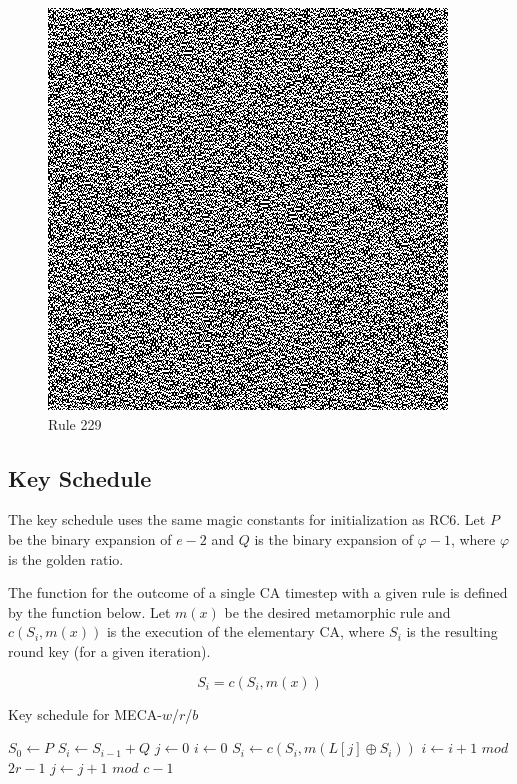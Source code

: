 \documentclass{article}
\begin{document}
\begin{figure}[H]
\begin{center}
\begin{minipage}{0.48\textwidth}
      \caption{Rule 229}
      \label{fig:figure10}
      \centering
      \includegraphics[scale=.5]{229.png}
    \end{minipage}
  \end{center}
\end{figure}

\subsection{Key Schedule}

The key schedule uses the same magic constants for initialization as RC6. Let $P$ be the binary expansion of $e-2$ and $Q$ is the binary expansion of $\varphi-1$, where $\varphi$ is the golden ratio.

The function for the outcome of a single CA timestep with a given rule is defined by the function below. Let $m(x)$ be the desired metamorphic rule and $c(S_i, m(x))$ is the execution of the elementary CA, where $S_i$ is the resulting round key (for a given iteration).

$$
 S_i = c(S_i, m(x)) 
$$

\begin{algorithm}[H]
  \begin{algorithmic}
    \caption{Key schedule for MECA-$w$/$r$/$b$}\label{alg:schedule}
    \Input
    \EndInput
    \Output
    \EndOutput
    \State $S_0 \gets P$
      \State $S_i \gets S_{i-1} + Q$
    \EndFor
    \State $j \gets 0$
    \State $i \gets 0$
      \State $S_i \gets c(S_i, m(L[j] \oplus S_i))$ 
      \State $i \gets i+1$ $mod$ $2r-1$
      \State $j \gets j+1$ $mod$ $c-1$
    \EndFor
  \end{algorithmic}
\end{algorithm}
\end{document}
